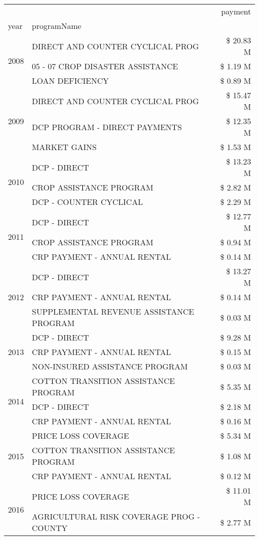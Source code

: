 \begin{tabular}{llr}
\toprule
 &  & payment \\
year & programName &  \\
\midrule
\multirow[t]{3}{*}{2008} & DIRECT AND COUNTER CYCLICAL PROG & \$ 20.83 M \\
 & 05 - 07 CROP DISASTER ASSISTANCE & \$ 1.19 M \\
 & LOAN DEFICIENCY & \$ 0.89 M \\
\cline{1-3}
\multirow[t]{3}{*}{2009} & DIRECT AND COUNTER CYCLICAL PROG & \$ 15.47 M \\
 & DCP PROGRAM - DIRECT PAYMENTS & \$ 12.35 M \\
 & MARKET GAINS & \$ 1.53 M \\
\cline{1-3}
\multirow[t]{3}{*}{2010} & DCP - DIRECT & \$ 13.23 M \\
 & CROP ASSISTANCE PROGRAM & \$ 2.82 M \\
 & DCP - COUNTER CYCLICAL & \$ 2.29 M \\
\cline{1-3}
\multirow[t]{3}{*}{2011} & DCP - DIRECT & \$ 12.77 M \\
 & CROP ASSISTANCE PROGRAM & \$ 0.94 M \\
 & CRP PAYMENT - ANNUAL RENTAL & \$ 0.14 M \\
\cline{1-3}
\multirow[t]{3}{*}{2012} & DCP - DIRECT & \$ 13.27 M \\
 & CRP PAYMENT - ANNUAL RENTAL & \$ 0.14 M \\
 & SUPPLEMENTAL REVENUE ASSISTANCE PROGRAM & \$ 0.03 M \\
\cline{1-3}
\multirow[t]{3}{*}{2013} & DCP - DIRECT & \$ 9.28 M \\
 & CRP PAYMENT - ANNUAL RENTAL & \$ 0.15 M \\
 & NON-INSURED ASSISTANCE PROGRAM & \$ 0.03 M \\
\cline{1-3}
\multirow[t]{3}{*}{2014} & COTTON TRANSITION ASSISTANCE PROGRAM & \$ 5.35 M \\
 & DCP - DIRECT & \$ 2.18 M \\
 & CRP PAYMENT - ANNUAL RENTAL & \$ 0.16 M \\
\cline{1-3}
\multirow[t]{3}{*}{2015} & PRICE LOSS COVERAGE & \$ 5.34 M \\
 & COTTON TRANSITION ASSISTANCE PROGRAM & \$ 1.08 M \\
 & CRP PAYMENT - ANNUAL RENTAL & \$ 0.12 M \\
\cline{1-3}
\multirow[t]{3}{*}{2016} & PRICE LOSS COVERAGE & \$ 11.01 M \\
 & AGRICULTURAL RISK COVERAGE PROG - COUNTY & \$ 2.77 M \\

\end{tabular}
